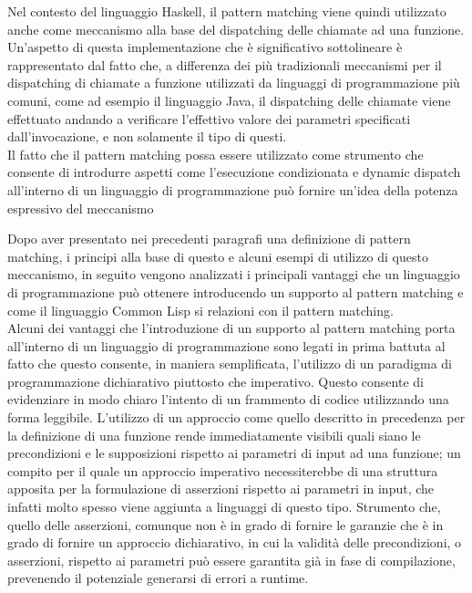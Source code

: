 Nel contesto del linguaggio Haskell, il pattern matching viene quindi
utilizzato anche come meccanismo alla base del dispatching delle chiamate ad
una funzione. Un’aspetto di questa implementazione che è significativo
sottolineare è rappresentato dal fatto che, a differenza dei più tradizionali
meccanismi per il dispatching di chiamate a funzione utilizzati da linguaggi di
programmazione più comuni, come ad esempio il linguaggio Java, il dispatching
delle chiamate viene effettuato andando a verificare l’effettivo valore dei
parametri specificati dall’invocazione, e non solamente il tipo di questi.\\

Il fatto che il pattern matching possa essere utilizzato come strumento che
consente di introdurre aspetti come l’esecuzione condizionata e dynamic
dispatch all’interno di un linguaggio di programmazione può fornire un’idea
della potenza espressivo del meccanismo

Dopo aver presentato nei precedenti paragrafi una definizione di pattern
matching, i principi alla base di questo e alcuni esempi di utilizzo di questo
meccanismo, in seguito vengono analizzati i principali vantaggi che un
linguaggio di programmazione può ottenere introducendo un supporto al pattern
matching e come il linguaggio Common Lisp si relazioni con il pattern
matching.\\

Alcuni dei vantaggi che l'introduzione di un supporto al pattern matching porta
all’interno di un linguaggio di programmazione sono legati in prima battuta al
fatto che questo consente, in maniera semplificata, l’utilizzo di un paradigma
di programmazione dichiarativo piuttosto che imperativo. Questo consente di
evidenziare in modo chiaro l’intento di un frammento di codice utilizzando una
forma leggibile. L’utilizzo di un approccio come quello descritto in precedenza
per la definizione di una funzione rende immediatamente visibili quali siano le
precondizioni e le supposizioni rispetto ai parametri di input ad una funzione;
un compito per il quale un approccio imperativo necessiterebbe di una struttura
apposita per la formulazione di asserzioni rispetto ai parametri in input, che
infatti molto spesso viene aggiunta a linguaggi di questo tipo. Strumento che,
quello delle asserzioni, comunque non è in grado di fornire le garanzie che è
in grado di fornire un approccio dichiarativo, in cui la validità delle
precondizioni, o asserzioni, rispetto ai parametri può essere garantita già in
fase di compilazione, prevenendo il potenziale generarsi di errori a runtime.\\

